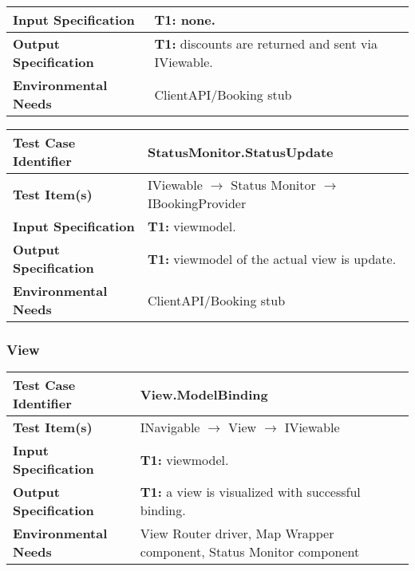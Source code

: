 {\begin{tabularx}{\textwidth}{l X}
    \textbf{Input Specification} & \textbf{T1:} none.\\
    \hline 
    
    \textbf{Output Specification} & \textbf{T1:} discounts are returned and sent via IViewable.\\
    \hline 
    
    \textbf{Environmental Needs} & ClientAPI/Booking stub\\
    \hline
\end{tabularx}
\bigskip 

\noindent
\begin{tabularx}{\textwidth}{l X}
    \hline 
    \textbf{Test Case Identifier} & StatusMonitor.StatusUpdate\\ 
    \hline 
    
    \textbf{Test Item(s)} & IViewable $\rightarrow$ Status Monitor $\rightarrow$ IBookingProvider\\
    \hline 
    
    \textbf{Input Specification} & \textbf{T1:} viewmodel.\\
    \hline 
    
    \textbf{Output Specification} & \textbf{T1:} viewmodel of the actual view is update. \\
    \hline 
    
    \textbf{Environmental Needs} & ClientAPI/Booking stub\\
    \hline
\end{tabularx}

\subsubsection{View}
\noindent
\begin{tabularx}{\textwidth}{l X}
    \hline 
    \textbf{Test Case Identifier} & View.ModelBinding\\ 
    \hline 
    
    \textbf{Test Item(s)} & INavigable $\rightarrow$ View $\rightarrow$ IViewable\\
    \hline 
    
    \textbf{Input Specification} & \textbf{T1:} viewmodel.\\
    \hline 
    
    \textbf{Output Specification} & \textbf{T1:} a view is visualized with successful binding.\\
    \hline 
    
    \textbf{Environmental Needs} & View Router driver, Map Wrapper component, Status Monitor component\\
    \hline
\end{tabularx}

}
